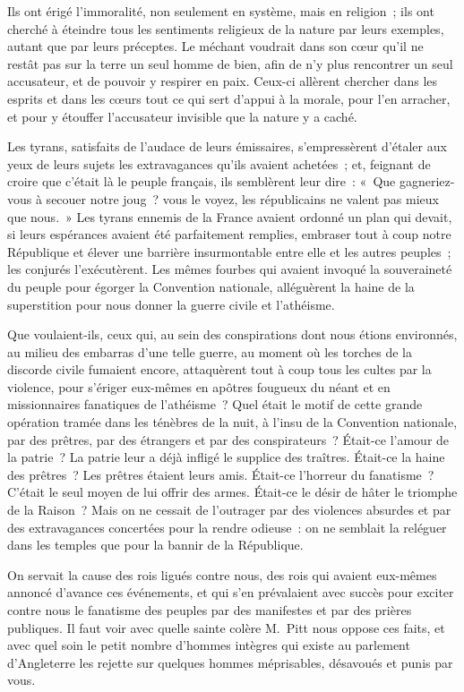 \documentclass[french,twoside]{book} %
\begin{document}
Ils ont érigé l’immoralité, non seulement en système, mais en religion ; ils ont cherché à éteindre tous les sentiments religieux de la nature par leurs exemples, autant que par leurs préceptes. Le méchant voudrait dans son cœur qu’il ne restât pas sur la terre un seul homme de bien, afin de n’y plus rencontrer un seul accusateur, et de pouvoir y respirer en paix. Ceux-ci allèrent chercher dans les esprits et dans les cœurs tout ce qui sert d’appui à la morale, pour l’en arracher, et pour y étouffer l’accusateur invisible que la nature y a caché.\par
Les tyrans, satisfaits de l’audace de leurs émissaires, s’empressèrent d’étaler aux yeux de leurs sujets les extravagances qu’ils avaient achetées ; et, feignant de croire que c’était là le peuple français, ils semblèrent leur dire : « Que gagneriez-vous à secouer notre joug ? vous le voyez, les républicains ne valent pas mieux que nous. » Les tyrans ennemis de la France avaient ordonné un plan qui devait, si leurs espérances avaient été parfaitement remplies, embraser tout à coup notre République et élever une barrière insurmontable entre elle et les autres peuples ; les conjurés l’exécutèrent. Les mêmes fourbes qui avaient invoqué la souveraineté du peuple pour égorger la Convention nationale, alléguèrent la haine de la superstition pour nous donner la guerre civile et l’athéisme.\par
Que voulaient-ils, ceux qui, au sein des conspirations dont nous étions environnés, au milieu des embarras d’une telle guerre, au moment où les torches de la discorde civile fumaient encore, attaquèrent tout à coup tous les cultes par la violence, pour s’ériger eux-mêmes en apôtres fougueux du néant et en missionnaires fanatiques de l’athéisme ? Quel était le motif de cette grande opération tramée dans les ténèbres de la nuit, à l’insu de la Convention nationale, par des prêtres, par des étrangers et par des conspirateurs ? Était-ce l’amour de la patrie ? La patrie leur a déjà infligé le supplice des traîtres. Était-ce la haine des prêtres ? Les prêtres étaient leurs amis. Était-ce l’horreur du fanatisme ? C’était le seul moyen de lui offrir des armes. Était-ce le désir de hâter le triomphe de la Raison ? Mais on ne cessait de l’outrager par des violences absurdes et par des extravagances concertées pour la rendre odieuse : on ne semblait la reléguer dans les temples que pour la bannir de la République.\par
On servait la cause des rois ligués contre nous, des rois qui avaient eux-mêmes annoncé d’avance ces événements, et qui s’en prévalaient avec succès pour exciter contre nous le fanatisme des peuples par des manifestes et par des prières publiques. Il faut voir avec quelle sainte colère M. Pitt nous oppose ces faits, et avec quel soin le petit nombre d’hommes intègres qui existe au parlement d’Angleterre les rejette sur quelques hommes méprisables, désavoués et punis par vous.\par
\end{document}
